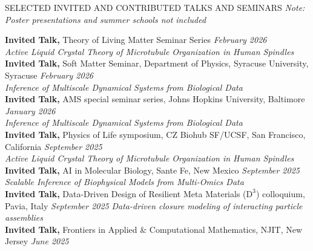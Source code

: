 \documentclass{resume} %
\begin{document}
\begin{rSection}{\small SELECTED INVITED AND CONTRIBUTED TALKS AND SEMINARS}
{\small \textit{Note: Poster presentations and summer schools not included}}

{\small \textbf{Invited Talk,} Theory of Living Matter Seminar Series} \hfill{\small \textit{February 2026}} \\
\textit{Active Liquid Crystal Theory of Microtubule Organization in Human Spindles} \\
{\small \textbf{Invited Talk,} Soft Matter Seminar, Department of Physics, Syracuse University,  Syracuse} \hfill{\small \textit{February 2026}}\\
{\small \textit{Inference of Multiscale Dynamical Systems from Biological Data} }
\\
{\small \textbf{Invited Talk,} AMS special seminar series, Johns Hopkins University, Baltimore} \hfill{\small \textit{January 2026}}\\
{\small \textit{Inference of Multiscale Dynamical Systems from Biological Data} }
\\
{ \small \textbf{Invited Talk,} Physics of Life symposium, CZ Biohub SF/UCSF, San Francisco, California} \hfill{\small \textit{September 2025}}\\
{\small \textit{Active Liquid Crystal Theory of Microtubule Organization in Human Spindles} }
\\
{ \small \textbf{Invited Talk,} AI in Molecular Biology, Sante Fe, New Mexico} \hfill{\small \textit{September 2025}}\\
{\small \textit{Scalable Inference of Biophysical Models from Multi-Omics Data} }
\\
{ \small \textbf{Invited Talk,} Data-Driven Design of Resilient Meta Materials ($\textrm{D}^3$) colloquium, Pavia, Italy} \hfill{\small \textit{September 2025}} 
{\small \textit{Data-driven closure modeling of interacting particle assemblies} }
\\
{ \small \textbf{Invited Talk,} Frontiers in Applied \& Computational Mathematics, NJIT, New Jersey} \hfill{\small \textit{June 2025}} \\

\end{rSection}
\end{document}
